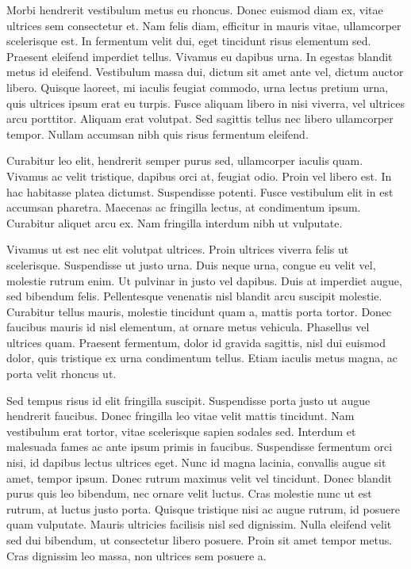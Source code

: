 Morbi hendrerit vestibulum metus eu rhoncus. Donec euismod diam ex, vitae ultrices sem consectetur et. Nam felis diam, efficitur in mauris vitae, ullamcorper scelerisque est. In fermentum velit dui, eget tincidunt risus elementum sed. Praesent eleifend imperdiet tellus. Vivamus eu dapibus urna. In egestas blandit metus id eleifend. Vestibulum massa dui, dictum sit amet ante vel, dictum auctor libero. Quisque laoreet, mi iaculis feugiat commodo, urna lectus pretium urna, quis ultrices ipsum erat eu turpis. Fusce aliquam libero in nisi viverra, vel ultrices arcu porttitor. Aliquam erat volutpat. Sed sagittis tellus nec libero ullamcorper tempor. Nullam accumsan nibh quis risus fermentum eleifend.

Curabitur leo elit, hendrerit semper purus sed, ullamcorper iaculis quam. Vivamus ac velit tristique, dapibus orci at, feugiat odio. Proin vel libero est. In hac habitasse platea dictumst. Suspendisse potenti. Fusce vestibulum elit in est accumsan pharetra. Maecenas ac fringilla lectus, at condimentum ipsum. Curabitur aliquet arcu ex. Nam fringilla interdum nibh ut vulputate.

Vivamus ut est nec elit volutpat ultrices. Proin ultrices viverra felis ut scelerisque. Suspendisse ut justo urna. Duis neque urna, congue eu velit vel, molestie rutrum enim. Ut pulvinar in justo vel dapibus. Duis at imperdiet augue, sed bibendum felis. Pellentesque venenatis nisl blandit arcu suscipit molestie. Curabitur tellus mauris, molestie tincidunt quam a, mattis porta tortor. Donec faucibus mauris id nisl elementum, at ornare metus vehicula. Phasellus vel ultrices quam. Praesent fermentum, dolor id gravida sagittis, nisl dui euismod dolor, quis tristique ex urna condimentum tellus. Etiam iaculis metus magna, ac porta velit rhoncus ut.

Sed tempus risus id elit fringilla suscipit. Suspendisse porta justo ut augue hendrerit faucibus. Donec fringilla leo vitae velit mattis tincidunt. Nam vestibulum erat tortor, vitae scelerisque sapien sodales sed. Interdum et malesuada fames ac ante ipsum primis in faucibus. Suspendisse fermentum orci nisi, id dapibus lectus ultrices eget. Nunc id magna lacinia, convallis augue sit amet, tempor ipsum. Donec rutrum maximus velit vel tincidunt. Donec blandit purus quis leo bibendum, nec ornare velit luctus. Cras molestie nunc ut est rutrum, at luctus justo porta. Quisque tristique nisi ac augue rutrum, id posuere quam vulputate. Mauris ultricies facilisis nisl sed dignissim. Nulla eleifend velit sed dui bibendum, ut consectetur libero posuere. Proin sit amet tempor metus. Cras dignissim leo massa, non ultrices sem posuere a.

